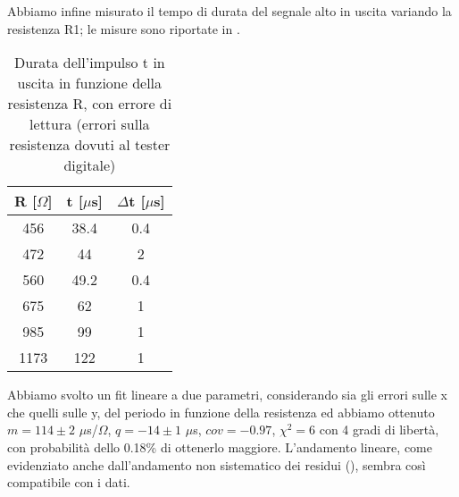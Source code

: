 Abbiamo infine misurato il tempo di durata del segnale alto in uscita variando la resistenza R1; le misure sono riportate in .
\begin{table}[h]
	\centering
	\begin{tabular}{ccc}
		{R [$\Omega$]} & {t [$\mu $s]} & {$\Delta$t [$\mu $s]} \\
		\midrule
           456 & 38.4 & 0.4\\
           472 & 44 & 2\\
           560 & 49.2 & 0.4\\
           675 & 62 & 1\\
           985 & 99 & 1\\
           1173 & 122 & 1\\
 	\end{tabular}
	\caption{ Durata dell'impulso t in uscita in funzione della resistenza R, con errore di lettura (errori sulla resistenza dovuti al tester digitale)}
	\label{t:Durata_impulso}
\end{table}
Abbiamo svolto un fit lineare a due parametri, considerando sia gli errori sulle x che quelli sulle y, del periodo in funzione della resistenza ed abbiamo ottenuto $m = 114 \pm 2$ $\mu$s/$\Omega$, $q = -14 \pm 1$ $\mu$s, $cov = -0.97$, $\chi^2 = 6$ con 4 gradi di libertà, con probabilità dello 0.18\% di ottenerlo maggiore. L'andamento lineare, come evidenziato anche dall'andamento non sistematico dei residui (), sembra così compatibile con i dati.